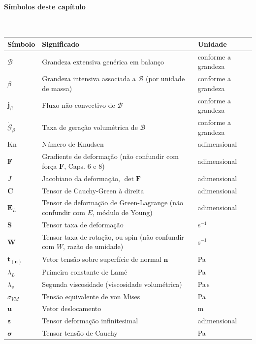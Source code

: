 \documentclass[12pt,a4paper]{article}
\numberwithin{equation}{section}
\numberwithin{table}{section}
\numberwithin{figure}{section}
\begin{document}
\paragraph{Símbolos deste capítulo}\mbox{}\\[-0.5em]
{\small
\begin{longtable}{>{\raggedright\arraybackslash}p{2.6cm} >{\raggedright\arraybackslash}p{9.2cm} >{\raggedright\arraybackslash}p{2.6cm}}
	\toprule
	\textbf{Símbolo} & \textbf{Significado} & \textbf{Unidade} \\ \midrule
	\endhead
	$\mathcal{B}$ & Grandeza extensiva genérica em balanço & conforme a grandeza \\
	$\beta$ & Grandeza intensiva associada a $\mathcal{B}$ (por unidade de massa) & conforme a grandeza \\
	$\mathbf{j}_\beta$ & Fluxo não convectivo de $\mathcal{B}$ & conforme a grandeza \\
	$\dot{\mathcal{G}}_\beta$ & Taxa de geração volumétrica de $\mathcal{B}$ & conforme a grandeza \\
	$\mathrm{Kn}$ & Número de Knudsen & adimensional \\
	$\mathbf{F}$ & Gradiente de deformação (não confundir com força $\mathbf{F}$, Caps. 6 e 8) & adimensional \\
	$J$ & Jacobiano da deformação, $\det\mathbf{F}$ & adimensional \\
	$\mathbf{C}$ & Tensor de Cauchy-Green à direita & adimensional \\
	$\mathbf{E}_L$ & Tensor de deformação de Green-Lagrange (não confundir com $E$, módulo de Young) & adimensional \\
	$\mathbf{S}$ & Tensor taxa de deformação & s$^{-1}$ \\
	$\mathbf{W}$ & Tensor taxa de rotação, ou spin (não confundir com $W$, razão de umidade) & s$^{-1}$ \\
	$\mathbf{t}_{(\mathbf{n})}$ & Vetor tensão sobre superfície de normal $\mathbf{n}$ & Pa \\
	$\lambda_L$ & Primeira constante de Lamé & Pa \\
	$\lambda_v$ & Segunda viscosidade (viscosidade volumétrica) & Pa\,s \\
	$\sigma_{VM}$ & Tensão equivalente de von Mises & Pa \\
	$\mathbf{u}$ & Vetor deslocamento & m \\
	$\boldsymbol{\varepsilon}$ & Tensor deformação infinitesimal & adimensional \\
	$\boldsymbol{\sigma}$ & Tensor tensão de Cauchy & Pa \\

\end{longtable}}
\end{document}
